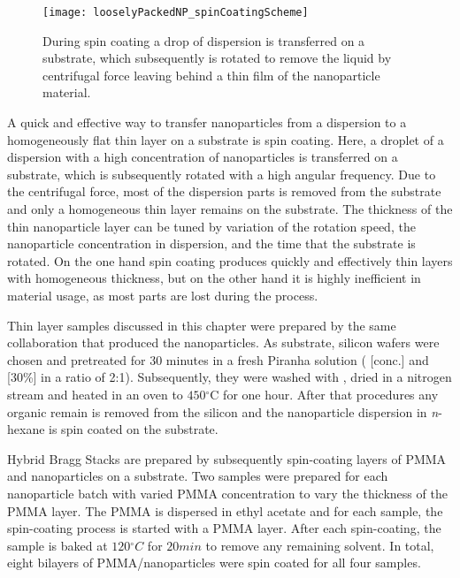 \documentclass[\main/dresen_thesis.tex]{subfiles}
\begin{document}
  \begin{figure}[tb]
    \centering
    \texttt{[image: looselyPackedNP\_spinCoatingScheme]}
    \caption{\label{fig:looselyPackedNP:preparation:spinCoatingScheme}During spin coating a drop of dispersion is transferred on a substrate, which subsequently is rotated to remove the liquid by centrifugal force leaving behind a thin film of the nanoparticle material.}
  \end{figure}

  A quick and effective way to transfer nanoparticles from a dispersion to a homogeneously flat thin layer on a substrate is spin coating.
  Here, a droplet of a dispersion with a high concentration of nanoparticles is transferred on a substrate, which is subsequently rotated with a high angular frequency.
  Due to the centrifugal force, most of the dispersion parts is removed from the substrate and only a homogeneous thin layer remains on the substrate.
  The thickness of the thin nanoparticle layer can be tuned by variation of the rotation speed, the nanoparticle concentration in dispersion, and the time that the substrate is rotated.
  On the one hand spin coating produces quickly and effectively thin layers with homogeneous thickness, but on the other hand it is highly inefficient in material usage, as most parts are lost during the process.

  Thin layer samples discussed in this chapter were prepared by the same collaboration that produced the nanoparticles.
  As substrate, silicon wafers were chosen and pretreated for 30 minutes in a fresh Piranha solution ( [conc.] and  [30\%] in a ratio of 2:1). Subsequently, they were washed with , dried in a nitrogen stream and heated in an oven to $450 \unit{^\circ \mathrm{C}}$ for one hour.
  After that procedures any organic remain is removed from the silicon and the nanoparticle dispersion in \textit{n}-hexane is spin coated on the substrate.

  Hybrid Bragg Stacks \cite{Schneider_2013_Defec, Schneider_2012_Engin} are prepared by subsequently spin-coating layers of PMMA and nanoparticles on a substrate.
  Two samples were prepared for each nanoparticle batch with varied PMMA concentration to vary the thickness of the PMMA layer.
  The PMMA is dispersed in ethyl acetate and for each sample, the spin-coating process is started with a PMMA layer.
  After each spin-coating, the sample is baked at $120 \unit{^\circ C}$ for $20 \unit{min}$ to remove any remaining solvent.
  In total, eight bilayers of PMMA/nanoparticles were spin coated for all four samples.
\end{document}
